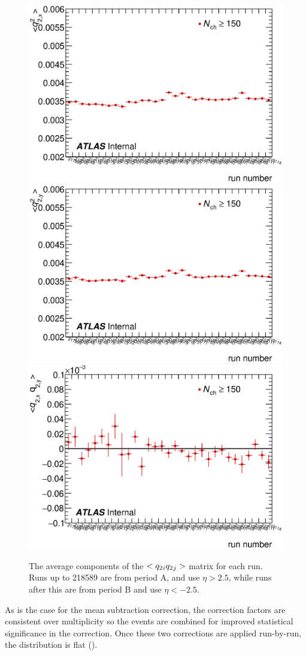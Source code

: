 \begin{figure}[t]
\centering
\includegraphics[width=.49\linewidth]{can_qxx.eps}
\includegraphics[width=.49\linewidth]{can_qyy.eps}\\
\includegraphics[width=.49\linewidth]{can_qxy.eps}
\caption{The average components of the $<q_{2}{}_i q_{2}{}_j>$ matrix for each run. Runs up to 218589 are from period A, and use $\eta > 2.5$, while runs after this are from period B and use $\eta < -2.5$.}
\label{fig:mean_q2_cov}
\end{figure}

As is the case for the mean subtraction correction, the correction factors are consistent over multiplicity so the events are combined for improved statistical significance in the correction.
Once these two corrections are applied run-by-run, the \psit distribution is flat ().


